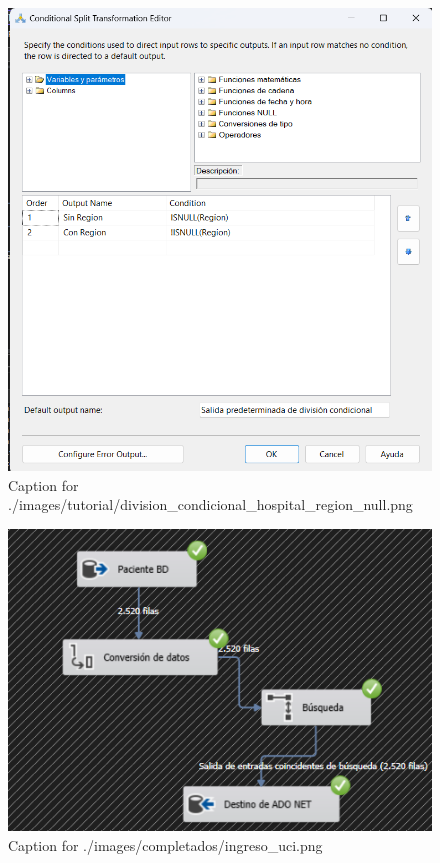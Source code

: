 \documentclass{article}
\begin{document}
\begin{figure}[H]
  \centering
  \includegraphics[width=\linewidth]{./images/tutorial/division_condicional_hospital_region_null.png}
  \caption{Caption for ./images/tutorial/division_condicional_hospital_region_null.png}
\end{figure}
\begin{figure}[H]
  \centering
  \includegraphics[width=\linewidth]{./images/completados/ingreso_uci.png}
  \caption{Caption for ./images/completados/ingreso_uci.png}
\end{figure}
\end{document}
